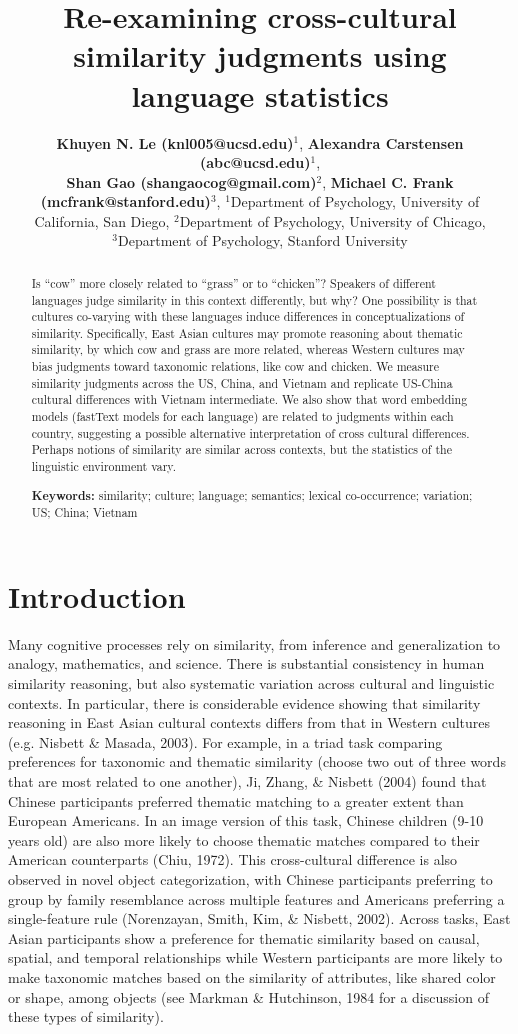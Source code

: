 \documentclass[10pt, letterpaper]{article}
\title{Re-examining cross-cultural similarity judgments using language
statistics}
\author{{\large \bf Khuyen N. Le (knl005@ucsd.edu)}$^{1}$, {\large \bf Alexandra Carstensen (abc@ucsd.edu)}$^{1}$, \\ {\large \bf Shan Gao (shangaocog@gmail.com)$^2$}, {\large \bf Michael C. Frank (mcfrank@stanford.edu)$^3$},  \AND $^1$Department of Psychology, University of California, San Diego, $^2$Department of Psychology, University of Chicago, \\ $^3$Department of Psychology, Stanford University }
\begin{document}
\maketitle

\begin{abstract}
Is ``cow'' more closely related to ``grass'' or to ``chicken''? Speakers
of different languages judge similarity in this context differently, but
why? One possibility is that cultures co-varying with these languages
induce differences in conceptualizations of similarity. Specifically,
East Asian cultures may promote reasoning about thematic similarity, by
which cow and grass are more related, whereas Western cultures may bias
judgments toward taxonomic relations, like cow and chicken. We measure
similarity judgments across the US, China, and Vietnam and replicate
US-China cultural differences with Vietnam intermediate. We also show
that word embedding models (fastText models for each language) are
related to judgments within each country, suggesting a possible
alternative interpretation of cross cultural differences. Perhaps
notions of similarity are similar across contexts, but the statistics of
the linguistic environment vary.

\textbf{Keywords:}
similarity; culture; language; semantics; lexical co-occurrence;
variation; US; China; Vietnam
\end{abstract}

\hypertarget{introduction}{%
\section{Introduction}\label{introduction}}

Many cognitive processes rely on similarity, from inference and
generalization to analogy, mathematics, and science. There is
substantial consistency in human similarity reasoning, but also
systematic variation across cultural and linguistic contexts. In
particular, there is considerable evidence showing that similarity
reasoning in East Asian cultural contexts differs from that in Western
cultures (e.g. Nisbett \& Masada, 2003). For example, in a triad task
comparing preferences for taxonomic and thematic similarity (choose two
out of three words that are most related to one another), Ji, Zhang, \&
Nisbett (2004) found that Chinese participants preferred thematic
matching to a greater extent than European Americans. In an image
version of this task, Chinese children (9-10 years old) are also more
likely to choose thematic matches compared to their American
counterparts (Chiu, 1972). This cross-cultural difference is also
observed in novel object categorization, with Chinese participants
preferring to group by family resemblance across multiple features and
Americans preferring a single-feature rule (Norenzayan, Smith, Kim, \&
Nisbett, 2002). Across tasks, East Asian participants show a preference
for thematic similarity based on causal, spatial, and temporal
relationships while Western participants are more likely to make
taxonomic matches based on the similarity of attributes, like shared
color or shape, among objects (see Markman \& Hutchinson, 1984 for a
discussion of these types of similarity).
\end{document}
